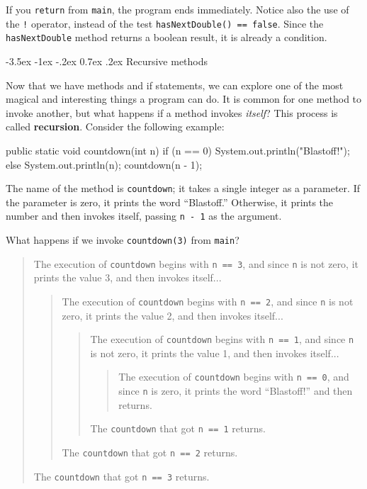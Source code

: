 \documentclass[12pt]{book}
\makeatletter
\theoremstyle{exercise}
\newcommand{\java}[1]{\verb"#1"}
\renewcommand{\section}{\@startsection {section}{1}{\z@}%
    {-3.5ex \@plus -1ex \@minus -.2ex}%
    {0.7ex \@plus.2ex}%
    {\normalfont\Large\bfseries}}
\newcommand{\java}[1]{\lstinline{#1}} %
\makeatother
\begin{document}
If you \java{return} from \java{main}, the program ends immediately.
Notice also the use of the \java{!} operator, instead of the test \java{hasNextDouble() == false}.
Since the \java{hasNextDouble} method returns a boolean result, it is already a condition.


\section{Recursive methods}
\label{recursion}


Now that we have methods and if statements, we can explore one of the most magical and interesting things a program can do.
It is common for one method to invoke another, but what happens if a method invokes {\em itself}?
This process is called {\bf recursion}.
Consider the following example:

\begin{code}
    public static void countdown(int n) {
        if (n == 0) {
            System.out.println("Blastoff!");
        } else {
            System.out.println(n);
            countdown(n - 1);
        }
    }
\end{code}

The name of the method is \java{countdown}; it takes a single integer as a parameter.
If the parameter is zero, it prints the word ``Blastoff.''
Otherwise, it prints the number and then invokes itself, passing \java{n - 1} as the argument.

What happens if we invoke \java{countdown(3)} from \java{main}?

\vspace{-1ex}
\begin{quote}
The execution of \java{countdown} begins with \java{n == 3}, and since \java{n} is not zero, it prints the value 3, and then invokes itself...
\begin{quote}
The execution of \java{countdown} begins with \java{n == 2}, and since \java{n} is not zero, it prints the value 2, and then invokes itself...
\begin{quote}
The execution of \java{countdown} begins with \java{n == 1}, and since \java{n} is not zero, it prints the value 1, and then invokes itself...
\begin{quote}
The execution of \java{countdown} begins with \java{n == 0}, and since \java{n} is zero, it prints the word ``Blastoff!'' and then returns.
\end{quote}
The \java{countdown} that got \java{n == 1} returns.
\end{quote}
The \java{countdown} that got \java{n == 2} returns.
\end{quote}
The \java{countdown} that got \java{n == 3} returns.
\end{quote}
\vspace{-1ex}
\end{document}
